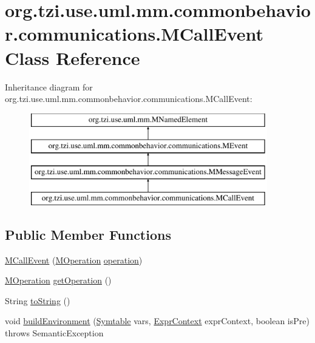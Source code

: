 \hypertarget{classorg_1_1tzi_1_1use_1_1uml_1_1mm_1_1commonbehavior_1_1communications_1_1_m_call_event}{\section{org.\-tzi.\-use.\-uml.\-mm.\-commonbehavior.\-communications.\-M\-Call\-Event Class Reference}
\label{classorg_1_1tzi_1_1use_1_1uml_1_1mm_1_1commonbehavior_1_1communications_1_1_m_call_event}
}
Inheritance diagram for org.\-tzi.\-use.\-uml.\-mm.\-commonbehavior.\-communications.\-M\-Call\-Event\-:\begin{figure}[H]
\begin{center}
\leavevmode
\includegraphics[height=4.000000cm]{classorg_1_1tzi_1_1use_1_1uml_1_1mm_1_1commonbehavior_1_1communications_1_1_m_call_event}
\end{center}
\end{figure}
\subsection*{Public Member Functions}
\begin{DoxyCompactItemize}
\item 
\hyperlink{classorg_1_1tzi_1_1use_1_1uml_1_1mm_1_1commonbehavior_1_1communications_1_1_m_call_event_a7fe4fa3f768326573ff0788502ca8707}{M\-Call\-Event} (\hyperlink{classorg_1_1tzi_1_1use_1_1uml_1_1mm_1_1_m_operation}{M\-Operation} \hyperlink{classorg_1_1tzi_1_1use_1_1uml_1_1mm_1_1commonbehavior_1_1communications_1_1_m_call_event_a67369d0c495bd1db0963cb8018b2e7e8}{operation})
\item 
\hyperlink{classorg_1_1tzi_1_1use_1_1uml_1_1mm_1_1_m_operation}{M\-Operation} \hyperlink{classorg_1_1tzi_1_1use_1_1uml_1_1mm_1_1commonbehavior_1_1communications_1_1_m_call_event_aa792b0ae8c79374c500a9e70bc64e02b}{get\-Operation} ()
\item 
String \hyperlink{classorg_1_1tzi_1_1use_1_1uml_1_1mm_1_1commonbehavior_1_1communications_1_1_m_call_event_a1854d7c9ccfdb20a329bbaeaf28879eb}{to\-String} ()
\item 
void \hyperlink{classorg_1_1tzi_1_1use_1_1uml_1_1mm_1_1commonbehavior_1_1communications_1_1_m_call_event_ae1a01c08795c3024fcd0af5cbcba91b7}{build\-Environment} (\hyperlink{classorg_1_1tzi_1_1use_1_1parser_1_1_symtable}{Symtable} vars, \hyperlink{classorg_1_1tzi_1_1use_1_1parser_1_1_expr_context}{Expr\-Context} expr\-Context, boolean is\-Pre)  throws Semantic\-Exception 
\end{DoxyCompactItemize}
